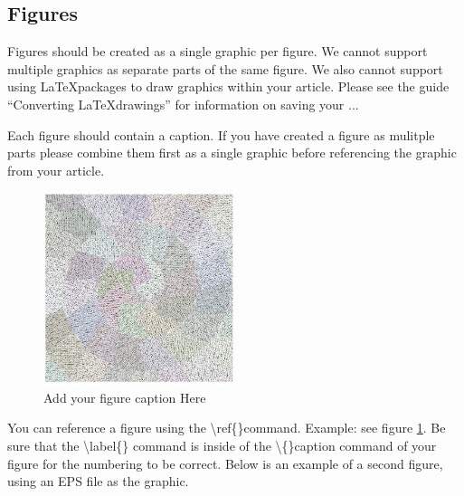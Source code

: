 \documentclass{csmagazine}
\begin{document}
\begin{flushleft}
\subsection{Figures}

Figures should be created as a single graphic per figure. We cannot support multiple graphics as separate parts of the same figure. We also cannot support using \LaTeX packages to draw graphics within your article. Please see the guide ``Converting \LaTeX drawings'' for information on saving your ...

Each figure should contain a caption. If you have created a figure as mulitple parts please combine them first as a single graphic before referencing the graphic from your article. 


\begin{figure}[H]
	\begin{center}	
		\includegraphics[width=0.5\textwidth]{figure_1.jpg}
		\caption{Add your figure caption Here \label{fig:example_fig}}		
	\end{center}
\end{figure}

You can reference a figure using the \textbackslash{}ref\{\}command. Example: see figure \ref{fig:example_fig}. Be sure that the \textbackslash{}label\{\} command is inside of the \textbackslash{}\{\}caption command of your figure for the numbering to be correct. Below is an example of a second figure, using an EPS file as the graphic.


\end{flushleft}
\end{document}
